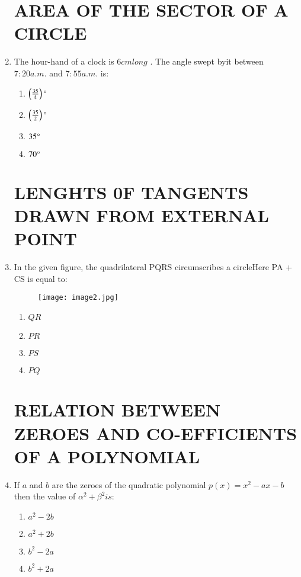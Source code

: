 \documentclass[12pt-letter paper]{article}
\providecommand{\brak}[1]{\ensuremath{\left(#1\right)}}
\begin{document}
\begin{enumerate}
\begin{center}
\section*{AREA OF THE SECTOR OF A CIRCLE}        
\end{center}
\item The hour-hand of a clock is $6 cm long$ . The angle swept byit between $7:20 a.m.$ and $7:55 a.m.$ is:
\begin{enumerate}
\item $ \left(\frac{35}{4}\right)\degree $
\item $ \left(\frac{35}{2}\right)\degree $                                
\item $ 35\degree $                  
\item $ 70\degree $  
\end{enumerate}                                    
\begin{center}                                    
\section*{ LENGHTS 0F TANGENTS DRAWN FROM EXTERNAL POINT}        
\end{center}
\newpage
\item In the given figure, the quadrilateral PQRS circumscribes a circleHere PA + CS is equal to:  
\begin{figure}[!ht]                                    
\centering                                            
\texttt{[image: image2.jpg]}      
\label{fig:image2}                                      
\end{figure}  
\begin{enumerate}
\item $ QR $
\item $ PR $                                          
\item $ PS $                                          
\item $ PQ $
\end{enumerate}                                          
\begin{center}                                    
\section*{ RELATION BETWEEN ZEROES AND CO-EFFICIENTS OF A POLYNOMIAL}        
\end{center}
\item If $a$ and $b$ are the zeroes of the quadratic polynomial $ p\brak x = x^2 - ax - b $ then the value of $ \alpha^
2 + \beta ^2 is $:
\begin{enumerate}
\item $ a^2-2b $                                  
\item $ a^2+2b $                                  
\item $ b^2-2a $                              
\item $ b^2+2a $  
\end{enumerate}                                    
\begin{center}                                    

\end{center}
\end{enumerate}
\end{document}
